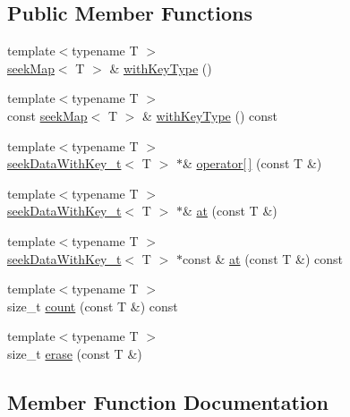 \subsection*{Public Member Functions}
\begin{DoxyCompactItemize}
\item 
{\footnotesize template$<$typename T $>$ }\\\mbox{\hyperlink{classebml_1_1seekMap}{seek\+Map}}$<$ T $>$ \& \mbox{\hyperlink{classebml_1_1seekMapBase_ad313f809e97617d93b23191d03805492}{with\+Key\+Type}} ()
\item 
{\footnotesize template$<$typename T $>$ }\\const \mbox{\hyperlink{classebml_1_1seekMap}{seek\+Map}}$<$ T $>$ \& \mbox{\hyperlink{classebml_1_1seekMapBase_a174a7a2a9e40d0465b1c065e9549b5b4}{with\+Key\+Type}} () const
\item 
{\footnotesize template$<$typename T $>$ }\\\mbox{\hyperlink{classebml_1_1seekDataWithKey__t}{seek\+Data\+With\+Key\+\_\+t}}$<$ T $>$ $\ast$\& \mbox{\hyperlink{classebml_1_1seekMapBase_ac2f1f5151d43f5a9c04adc835fdc456f}{operator\mbox{[}$\,$\mbox{]}}} (const T \&)
\item 
{\footnotesize template$<$typename T $>$ }\\\mbox{\hyperlink{classebml_1_1seekDataWithKey__t}{seek\+Data\+With\+Key\+\_\+t}}$<$ T $>$ $\ast$\& \mbox{\hyperlink{classebml_1_1seekMapBase_a905bdf0b6e4dd19d7a2213391dcc3a0e}{at}} (const T \&)
\item 
{\footnotesize template$<$typename T $>$ }\\\mbox{\hyperlink{classebml_1_1seekDataWithKey__t}{seek\+Data\+With\+Key\+\_\+t}}$<$ T $>$ $\ast$const  \& \mbox{\hyperlink{classebml_1_1seekMapBase_addaab912ae0ef0fc525db52cbdb0aad5}{at}} (const T \&) const
\item 
{\footnotesize template$<$typename T $>$ }\\size\+\_\+t \mbox{\hyperlink{classebml_1_1seekMapBase_ac86fad8357bb9738ba022cfdb7f8e43c}{count}} (const T \&) const
\item 
{\footnotesize template$<$typename T $>$ }\\size\+\_\+t \mbox{\hyperlink{classebml_1_1seekMapBase_abeda7aee2215f0aec47e8ff0d607a902}{erase}} (const T \&)
\end{DoxyCompactItemize}


\subsection{Member Function Documentation}
\mbox{\label{classebml_1_1seekMapBase_a905bdf0b6e4dd19d7a2213391dcc3a0e}} 
